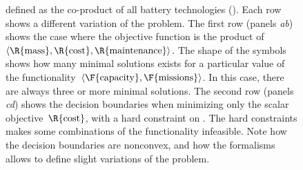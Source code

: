 \begin{figure}
{defined as the co-product of all battery technologies ().
Each row shows a different variation of the problem. The first row
(panels \emph{a}\textendash \emph{b}) shows the case where the objective
function is the product of~$\left\langle \R{\text{mass}},\R{\text{cost}},\R{\text{maintenance}}\right\rangle $.
The shape of the symbols shows how many minimal solutions exists for
a particular value of the functionality~$\left\langle \F{\text{capacity}},\F{\text{missions}}\right\rangle $.
In this case, there are always three or more minimal solutions. The
second row (panels \emph{c}\textendash \emph{d}) shows the decision
boundaries when minimizing only the scalar objective~$\R{\text{cost}}$,
with a hard constraint on . The hard constraints makes some
combinations of the functionality infeasible. Note how the decision
boundaries are nonconvex, and how the formalisms allows to define
slight variations of the problem.}
\end{figure}
